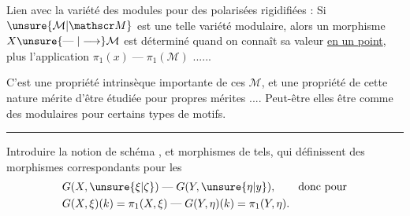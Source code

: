 Lien avec la variété des modules pour des  polarisées rigidifiées : Si  $\unsure{\mathcal M|\mathscr M}$ est une telle variété modulaire, alors\unsure{,} un morphisme $X\unsure{\mathrel{\text{---}}|\longrightarrow}\mathcal M$ est déterminé quand on connaît sa valeur \uline{en un point}, plus l'application $\pi_1(x)\mathrel{\text{---}}\pi_1(\mathcal M)$ ......

C'est une propriété intrinsèque importante de ces $\mathcal M$, et une propriété de cette nature mérite d'être étudiée pour  propres mérites .... Peut-être  elles  être   comme des   modulaires pour certains types de motifs.

\begin{center}\rule{3cm}{0.5pt}\end{center}

Introduire la notion de schéma   , et morphismes de tels, qui définissent des morphismes correspondants pour les
\[
\begin{aligned}
&G(X,\unsure{\xi|\zeta})\mathrel{\text{---}}G(Y,\unsure{\eta|y}),\qquad\text{donc pour}\\
&G(X,\xi)(k)=\pi_1(X,\xi)\mathrel{\text{---}}G(Y,\eta)(k)=\pi_1(Y,\eta).
\end{aligned}
\]

